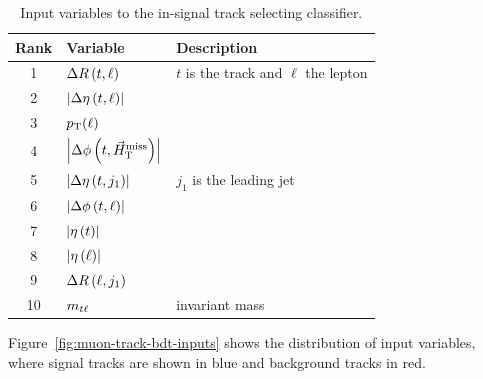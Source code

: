 \begin{table}[!htb]
	\centering
	
		\caption{\label{tab:track-bdt-variables}Input variables to the in-signal track selecting classifier.}
			\begin{tabular}{cll} \hline
			Rank & Variable & Description \\ \hline
			1 & $\Delta R\left(t, \ell\right)$ & $t$ is the track and $\ell$ the lepton\\
			2 & $\abs{\Delta \eta \left(t, \ell\right) }$ & \\
			3 & $p_{\mathrm{T}}(\ell)$ & \\
			
			4 & $\abs{\Delta\phi\left(t, \vec{H}_{\text{T}}^{\text{miss}} \right)}$ & \\
			5 & $\abs{\Delta\eta\left(t, j_1 \right)}$ & $j_1$ is the leading \pt jet\\
			6 & $\abs{\Delta\phi\left(t, \ell \right)}$ & \\
			7 & $\abs{\eta\left(t\right)}$ & \\
			8 & $\abs{\eta\left(\ell\right)}$ & \\
			9 & $\Delta R\left(\ell, j_1\right)$ & \\
			10 & $m_{t\ell}$ & invariant mass \\ 
			\hline
			\end{tabular}
\end{table}

Figure~\ref{fig:muon-track-bdt-inputs} shows the distribution of input variables, where signal tracks are shown in blue and background tracks in red.

